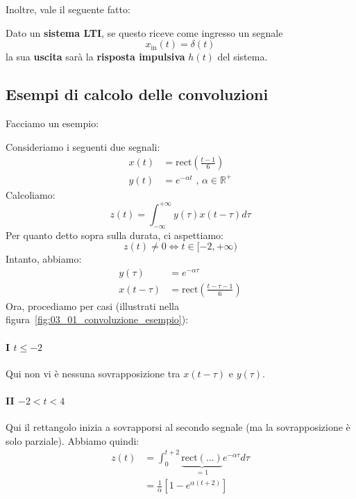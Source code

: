 Inoltre, vale il seguente fatto:

\begin{prop}
    Dato un \textbf{sistema LTI}, se questo riceve come ingresso un segnale
    \[
        x_{\text{in}}(t) = \delta(t) 
    \] 
    la sua \textbf{uscita} sarà la \textbf{risposta impulsiva} $h(t)$ del sistema.
\end{prop}

\subsection{Esempi di calcolo delle convoluzioni}

Facciamo un esempio:

\begin{exa}
    Consideriamo i seguenti due segnali:
    \[
        \begin{aligned}
            x(t) &= \text{rect}\left( \frac{t-1}{6} \right) \\ 
            y(t) &= e^{-\alpha t} \text{ , } \alpha\in \mathbb{R}^+
        \end{aligned}
    \] 
    Calcoliamo:
    \[
        z(t) = \int_{-\infty}^{+\infty} y(\tau )x(t-\tau )d\tau
    \]
    Per quanto detto sopra sulla durata, ci aspettiamo:
    \[
        z(t) \ne 0 \Leftrightarrow t\in [-2,+\infty)
    \]
    Intanto, abbiamo:
    \[
        \begin{aligned}
            y(\tau ) &= e^{-\alpha \tau } \\ 
            x(t-\tau ) &= \text{rect}\left( \frac{t-\tau -1}{6} \right)
        \end{aligned}
    \] 
    Ora, procediamo per casi (illustrati nella figura~\ref{fig:03_01_convoluzione_esempio}):

    \paragraph{I $t\le -2$} Qui non vi è nessuna sovrapposizione tra $x(t-\tau )$
    e $y(\tau )$.

    \paragraph{II $-2<t<4$} Qui il rettangolo inizia a sovrapporsi al secondo 
    segnale (ma la sovrapposizione è solo parziale). Abbiamo quindi:
    \[
        \begin{aligned}
            z(t) &= \int_{0}^{t+2} \underbrace{ \text{rect}(\ldots ) }_{=1} e^{-\alpha \tau }d\tau \\
            &=\frac{1}{\alpha}\left[ 1 - e^{\alpha(t+2)} \right] 
        \end{aligned}
    \] 

\end{exa}
